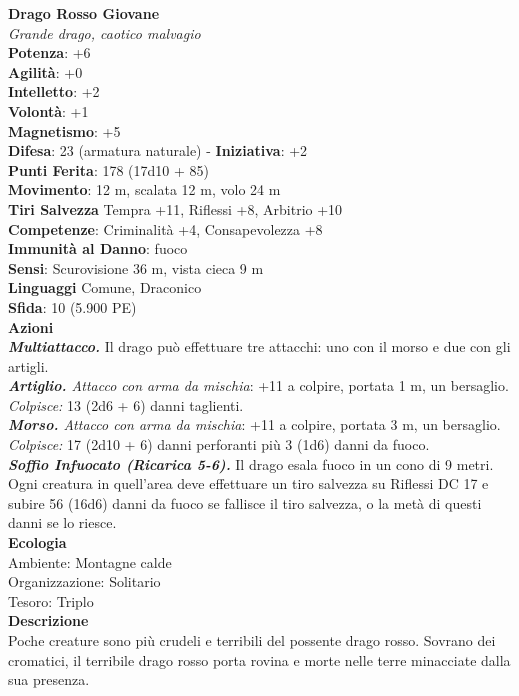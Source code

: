 \begin{multicols}{2}
\medskip\textbf{Drago Rosso Giovane}\\
\emph{Grande drago, caotico malvagio}\\
\textbf{Potenza}: +6\\
\textbf{Agilità}: +0\\
\textbf{Intelletto}: +2\\
\textbf{Volontà}: +1\\
\textbf{Magnetismo}: +5\\
\textbf{Difesa}: 23 (armatura naturale) - \textbf{Iniziativa}: +2\\
\textbf{Punti Ferita}: 178 (17d10 + 85)\\
\textbf{Movimento}: 12 m, scalata 12 m, volo 24 m\\
\textbf{Tiri Salvezza} Tempra +11, Riflessi +8, Arbitrio +10\\
\textbf{Competenze}: Criminalità +4, Consapevolezza +8\\
\textbf{Immunità al Danno}: fuoco\\
\textbf{Sensi}: Scurovisione 36 m, vista cieca 9 m\\
\textbf{Linguaggi} Comune, Draconico\\
\textbf{Sfida}: 10 (5.900 PE)\smallskip\\
\smallskip\textbf{Azioni}\\
\emph{\textbf{Multiattacco.}} Il drago può effettuare tre attacchi: uno con il morso e due con gli artigli.\\
\emph{\textbf{Artiglio.} Attacco con arma da mischia}: +11 a colpire, portata 1 m, un bersaglio.\\
\emph{Colpisce:} 13 (2d6 + 6) danni taglienti. \\
\emph{\textbf{Morso.} Attacco con arma da mischia}: +11 a colpire, portata 3 m, un bersaglio.\\
\emph{Colpisce:} 17 (2d10 + 6) danni perforanti più 3 (1d6) danni da fuoco.\\
\emph{\textbf{Soffio Infuocato (Ricarica 5-6).}} Il drago esala fuoco in un cono di 9 metri. Ogni creatura in quell'area deve effettuare un tiro salvezza su Riflessi DC 17 e subire 56 (16d6) danni da fuoco se fallisce il tiro salvezza, o la metà di questi danni se lo riesce.\\
\textbf{Ecologia}\\
Ambiente: Montagne calde\\
Organizzazione: Solitario\\
Tesoro: Triplo\\
\textbf{Descrizione}\\
Poche creature sono più crudeli e terribili del possente drago rosso. Sovrano dei cromatici, il terribile drago rosso porta rovina e morte nelle terre minacciate dalla sua presenza.\\


\end{multicols}
